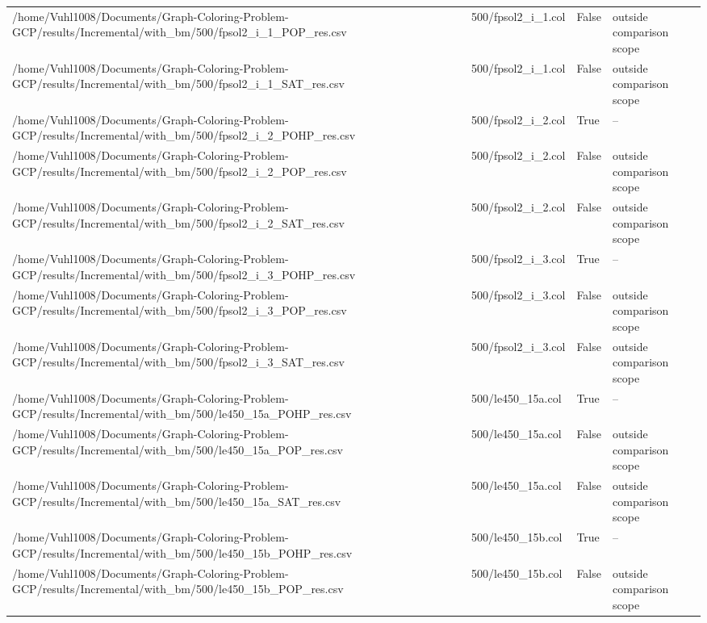 \begin{table}[htbp]
\begin{tabular}{llll}
/home/Vuhl1008/Documents/Graph-Coloring-Problem-GCP/results/Incremental/with\_bm/500/fpsol2\_i\_1\_POP\_res.csv & 500/fpsol2\_i\_1.col & False & outside comparison scope \\
/home/Vuhl1008/Documents/Graph-Coloring-Problem-GCP/results/Incremental/with\_bm/500/fpsol2\_i\_1\_SAT\_res.csv & 500/fpsol2\_i\_1.col & False & outside comparison scope \\
/home/Vuhl1008/Documents/Graph-Coloring-Problem-GCP/results/Incremental/with\_bm/500/fpsol2\_i\_2\_POHP\_res.csv & 500/fpsol2\_i\_2.col & True & -- \\
/home/Vuhl1008/Documents/Graph-Coloring-Problem-GCP/results/Incremental/with\_bm/500/fpsol2\_i\_2\_POP\_res.csv & 500/fpsol2\_i\_2.col & False & outside comparison scope \\
/home/Vuhl1008/Documents/Graph-Coloring-Problem-GCP/results/Incremental/with\_bm/500/fpsol2\_i\_2\_SAT\_res.csv & 500/fpsol2\_i\_2.col & False & outside comparison scope \\
/home/Vuhl1008/Documents/Graph-Coloring-Problem-GCP/results/Incremental/with\_bm/500/fpsol2\_i\_3\_POHP\_res.csv & 500/fpsol2\_i\_3.col & True & -- \\
/home/Vuhl1008/Documents/Graph-Coloring-Problem-GCP/results/Incremental/with\_bm/500/fpsol2\_i\_3\_POP\_res.csv & 500/fpsol2\_i\_3.col & False & outside comparison scope \\
/home/Vuhl1008/Documents/Graph-Coloring-Problem-GCP/results/Incremental/with\_bm/500/fpsol2\_i\_3\_SAT\_res.csv & 500/fpsol2\_i\_3.col & False & outside comparison scope \\
/home/Vuhl1008/Documents/Graph-Coloring-Problem-GCP/results/Incremental/with\_bm/500/le450\_15a\_POHP\_res.csv & 500/le450\_15a.col & True & -- \\
/home/Vuhl1008/Documents/Graph-Coloring-Problem-GCP/results/Incremental/with\_bm/500/le450\_15a\_POP\_res.csv & 500/le450\_15a.col & False & outside comparison scope \\
/home/Vuhl1008/Documents/Graph-Coloring-Problem-GCP/results/Incremental/with\_bm/500/le450\_15a\_SAT\_res.csv & 500/le450\_15a.col & False & outside comparison scope \\
/home/Vuhl1008/Documents/Graph-Coloring-Problem-GCP/results/Incremental/with\_bm/500/le450\_15b\_POHP\_res.csv & 500/le450\_15b.col & True & -- \\
/home/Vuhl1008/Documents/Graph-Coloring-Problem-GCP/results/Incremental/with\_bm/500/le450\_15b\_POP\_res.csv & 500/le450\_15b.col & False & outside comparison scope \\

\end{tabular}
\end{table}
